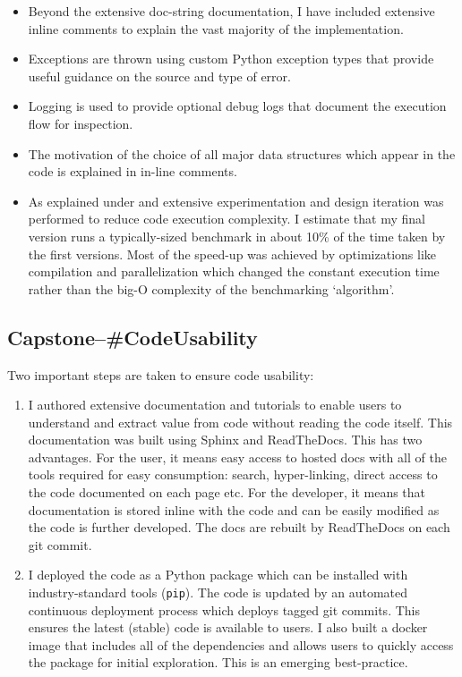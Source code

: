 \documentclass[../main.tex]{subfiles}
\begin{document}
\begin{itemize}
    \item Beyond the extensive doc-string documentation, I have included extensive inline comments to explain the vast majority of the implementation.
    
    \item Exceptions are thrown using custom Python exception types that provide useful guidance on the source and type of error.
    
    \item Logging is used to provide optional debug logs that document the execution flow for inspection.
    
    \item The motivation of the choice of all major data structures which appear in the code is explained in in-line comments.
    
    \item As explained under  and  extensive experimentation and design iteration was performed to reduce code execution complexity. I estimate that my final version runs a typically-sized benchmark in about 10\% of the time taken by the first versions. Most of the speed-up was achieved by optimizations like compilation and parallelization which changed the constant execution time rather than the big-O complexity of the benchmarking `algorithm'.
\end{itemize}


\subsection*{\textbf{Capstone--\#CodeUsability}}
\label{lo:CodeUsability}

Two important steps are taken to ensure code usability:

\begin{enumerate}
    \item I authored extensive documentation and tutorials to enable users to understand and extract value from code without reading the code itself. This documentation was built using Sphinx and ReadTheDocs. This has two advantages. For the user, it means easy access to hosted docs with all of the tools required for easy consumption: search, hyper-linking, direct access to the code documented on each page etc. For the developer, it means that documentation is stored inline with the code and can be easily modified as the code is further developed. The docs are rebuilt by ReadTheDocs on each git commit.
    
    \item I deployed the code as a Python package which can be installed with industry-standard tools (\texttt{pip}). The code is updated by an automated continuous deployment process which deploys tagged git commits. This ensures the latest (stable) code is available to users. I also built a docker image that includes all of the dependencies and allows users to quickly access the package for initial exploration. This is an emerging best-practice.
    
\end{enumerate}

\end{document}
